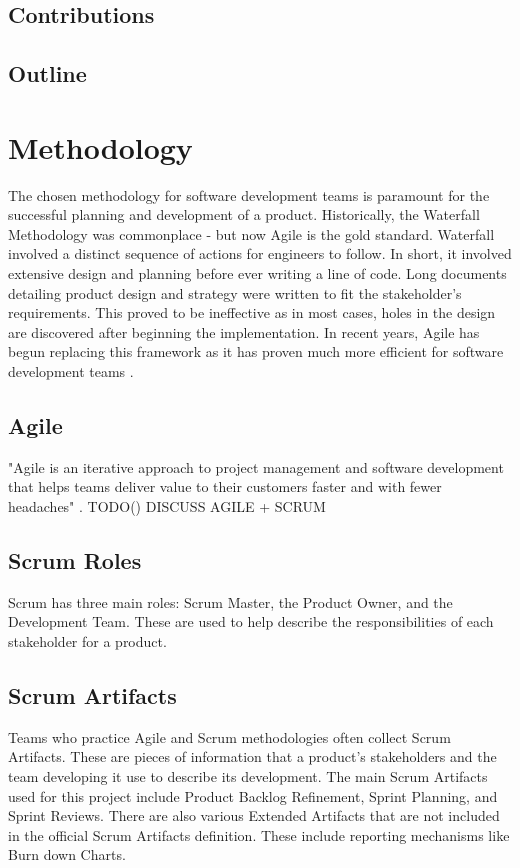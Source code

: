 \documentclass{article}
\begin{document}
\subsection{Contributions}



\subsection{Outline}



\section{Methodology}
The chosen methodology for software development teams is paramount for the successful planning and development of a product. Historically, the Waterfall Methodology was commonplace - but now Agile is the gold standard. Waterfall involved a distinct sequence of actions for engineers to follow. In short, it involved extensive design and planning before ever writing a line of code. Long documents detailing product design and strategy were written to fit the stakeholder's requirements. This proved to be ineffective as in most cases, holes in the design are discovered after beginning the implementation. In recent years, Agile has begun replacing this framework as it has proven much more efficient for software development teams \cite{agile-waterfall}.



\subsection{Agile}
"Agile is an iterative approach to project management and software development that helps teams deliver value to their customers faster and with fewer headaches" \cite{what-is-agile}. TODO()
DISCUSS AGILE + SCRUM



\subsection{Scrum Roles}
Scrum has three main roles: Scrum Master, the Product Owner, and the Development Team. These are used to help describe the responsibilities of each stakeholder for a product.



\subsection{Scrum Artifacts}
Teams who practice Agile and Scrum methodologies often collect Scrum Artifacts. These are pieces of information that a product's stakeholders and the team developing it use to describe its development. The main Scrum Artifacts used for this project include Product Backlog Refinement, Sprint Planning, and Sprint Reviews. There are also various Extended Artifacts that are not included in the official Scrum Artifacts definition. These include reporting mechanisms like Burn down Charts.
\end{document}
